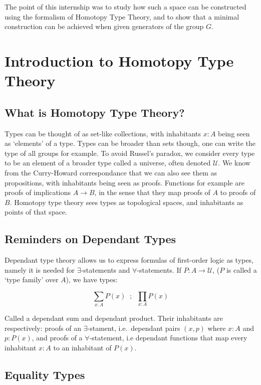 \documentclass{article}
\begin{document}
The point of this internship was to study how such a space can be constructed using the formalism of Homotopy Type Theory, and to show that a minimal construction can be achieved when given generators of the group $G$.

\section{Introduction to Homotopy Type Theory}

\subsection{What is Homotopy Type Theory?}

Types can be thought of as set-like collections, with inhabitants $x : A$ being seen as `elements' of a type. Types can be broader than sets though, one can write the type of all groups for example. To avoid Russel's paradox, we consider every type to be an element of a broader type called a universe, often denoted $\mathcal{U}$. We know from the Curry-Howard correspondance that we can also see them as propositions, with inhabitants being seen as proofs. Functions for example are proofs of implications $A \to B$, in the sense that they map proofs of $A$ to proofs of $B$. Homotopy type theory sees types as topological spaces, and inhabitants as points of that space.


\subsection{Reminders on Dependant Types}

Dependant type theory allows us to express formulas of first-order logic as types, namely it is needed for $\exists$-statements and $\forall$-statements. If $P : A \to \mathcal{U}$, ($P$ is called a `type family' over $A$), we have types:

\[\sum_{x : A}P(x) \; \; ; \; \; \prod_{x : A}P(x) \]

Called a dependant sum and dependant product. Their inhabitants are respectively: proofs of an $\exists$-stament, i.e.\ dependant pairs $(x , p)$ where $x : A$ and $p : P(x)$, and proofs of a $\forall$-statement, i.e dependant functions that map every inhabitant $x : A$ to an inhabitant of $P(x)$.

\subsection{Equality Types}
\end{document}
